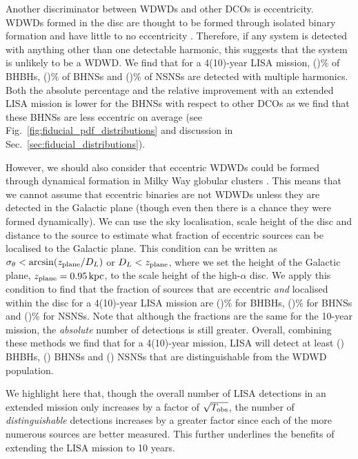 Another discriminator between WDWDs and other DCOs is eccentricity. WDWDs formed in the disc are thought to be formed through isolated binary formation and have little to no eccentricity \citep[e.g.][]{Nelemans+2001}. Therefore, if any system is detected with anything other than one detectable harmonic, this suggests that the system is unlikely to be a WDWD. We find that for a 4(10)-year LISA mission, \BHBHMultipleHarmonicsFourPerc{}(\BHBHMultipleHarmonicsTenPerc{})\% of BHBHs, \BHNSMultipleHarmonicsFourPerc{}(\BHNSMultipleHarmonicsTenPerc{})\% of BHNSs and \NSNSMultipleHarmonicsFourPerc(\NSNSMultipleHarmonicsTenPerc{})\% of NSNSs are detected with multiple harmonics. Both the absolute percentage and the relative improvement with an extended LISA mission is lower for the BHNSs with respect to other DCOs as we find that these BHNSs are less eccentric on average (see Fig.~\ref{fig:fiducial_pdf_distributions} and discussion in Sec.~\ref{sec:fiducial_distributions}).

However, we should also consider that eccentric WDWDs could be formed through dynamical formation in Milky Way globular clusters \citep[e.g.][]{Willems+2007, Kremer+2018}. This means that we cannot assume that eccentric binaries are not WDWDs unless they are detected in the Galactic plane (though even then there is a chance they were formed dynamically). We can use the sky localisation, scale height of the disc and distance to the source to estimate what fraction of eccentric sources can be localised to the Galactic plane. This condition can be written as $\sigma_\theta < \arcsin(z_{\rm plane} / D_L)$ or $D_L < z_{\rm plane}$, where we set the height of the Galactic plane, $z_{\rm plane}=0.95 \unit{kpc}$, to the scale height of the high-$\alpha$ disc. We apply this condition to find that the fraction of sources that are eccentric \textit{and} localised within the disc for a 4(10)-year LISA mission are \BHBHEccInDiscFourPerc{}(\BHBHEccInDiscTenPerc{})\% for BHBHs, \BHNSEccInDiscFourPerc{}(\BHNSEccInDiscTenPerc{})\% for BHNSs and \NSNSEccInDiscFourPerc{}(\NSNSEccInDiscTenPerc{})\% for NSNSs. Note that although the fractions are the same for the 10-year mission, the \textit{absolute} number of detections is still greater.
%
Overall, combining these methods we find that for a 4(10)-year mission, LISA will detect at least \BHBHNotWDWDFour{}(\BHBHNotWDWDTen{}) BHBHs, \BHNSNotWDWDFour{}(\BHNSNotWDWDTen{}) BHNSs and \NSNSNotWDWDFour{}(\NSNSNotWDWDTen{}) NSNSs that are distinguishable from the WDWD population.

We highlight here that, though the overall number of LISA detections in an extended mission only increases by a factor of $\sqrt{T_{\rm obs}}$, the number of \textit{distinguishable} detections increases by a greater factor since each of the more numerous sources are better measured. This further underlines the benefits of extending the LISA mission to 10 years.

